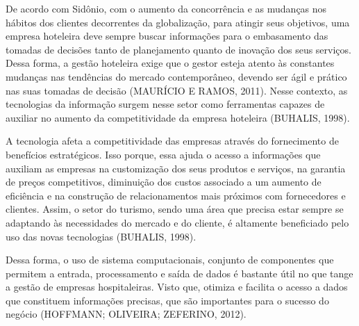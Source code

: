 De acordo com Sidônio, com o aumento da concorrência e as mudanças nos hábitos dos clientes decorrentes da globalização, para atingir seus objetivos, uma empresa hoteleira deve sempre buscar informações para o embasamento das tomadas de decisões tanto de planejamento quanto de inovação dos seus serviços. Dessa forma,  a gestão hoteleira exige que o gestor esteja atento às constantes mudanças nas tendências do mercado contemporâneo, devendo ser ágil e prático nas suas tomadas de decisão (MAURÍCIO E RAMOS, 2011). Nesse contexto, as tecnologias da informação surgem nesse setor como ferramentas capazes de auxiliar no aumento da competitividade da empresa hoteleira (BUHALIS, 1998). 

A tecnologia afeta a competitividade das empresas através do fornecimento de benefícios estratégicos. Isso porque, essa ajuda o acesso a informações que auxiliam as empresas na customização dos seus produtos e serviços,  na garantia de preços competitivos, diminuição dos custos associado a um aumento de eficiência e na construção de relacionamentos mais próximos com fornecedores e clientes. Assim, o setor do turismo, sendo uma área que precisa estar sempre se adaptando às necessidades do mercado e do cliente, é altamente beneficiado pelo uso das novas tecnologias  (BUHALIS, 1998).

Dessa forma, o uso de sistema computacionais, conjunto de componentes que permitem a entrada, processamento e saída de dados é bastante útil no que tange a gestão de empresas hospitaleiras. Visto que, otimiza e facilita o acesso a dados que constituem informações precisas,  que são importantes para o sucesso do negócio (HOFFMANN; OLIVEIRA; ZEFERINO, 2012).


